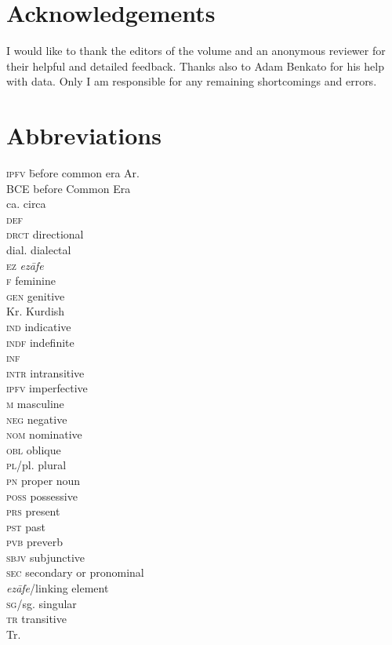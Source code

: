 \documentclass[output=paper]{langsci/langscibook}
\begin{document}
\section*{Acknowledgements}
I would like to thank the editors of the volume and an anonymous reviewer for their helpful and detailed feedback. Thanks also to Adam Benkato for his help with  data. Only I am responsible for any remaining shortcomings and errors. 

\section*{Abbreviations}
\begin{multicols}{2}
\begin{tabbing}
\textsc{ipfv} \hspace{1em} \= before common era\kill
Ar.              \> \\
BCE             \> before Common Era\\
ca.             \> circa\\
\textsc{def}    \>  \\
\textsc{drct}   \> directional\\
dial.           \> dialectal \\
\textsc{ez}     \> \textit{ezāfe} \\
\textsc{f}      \> feminine \\
\textsc{gen}    \> genitive\\
Kr.             \> Kurdish\\
\textsc{ind}    \> indicative \\
\textsc{indf}   \> indefinite \\
\textsc{inf}    \> \\
\textsc{intr}   \> intransitive\\
\textsc{ipfv}   \> imperfective \\
\textsc{m}      \> masculine \\
\textsc{neg}    \> negative\\
\textsc{nom}    \> nominative\\
\textsc{obl}    \> oblique\\
\textsc{pl/}pl. \> plural \\
\textsc{pn}     \> proper noun\\
\textsc{poss}   \> possessive \\
\textsc{prs}    \> present \\
\textsc{pst}    \> past \\
\textsc{pvb}    \> preverb\\
\textsc{sbjv}   \> subjunctive \\
\textsc{sec}    \> secondary or pronominal \\ \> \textit{ezāfe}/linking element\\
\textsc{sg/}sg. \> singular\\
\textsc{tr}     \> transitive\\
Tr.             \> 
\end{tabbing}
\end{multicols}


{\sloppy\printbibliography[heading=subbibliography,notkeyword=this]}
\end{document}
